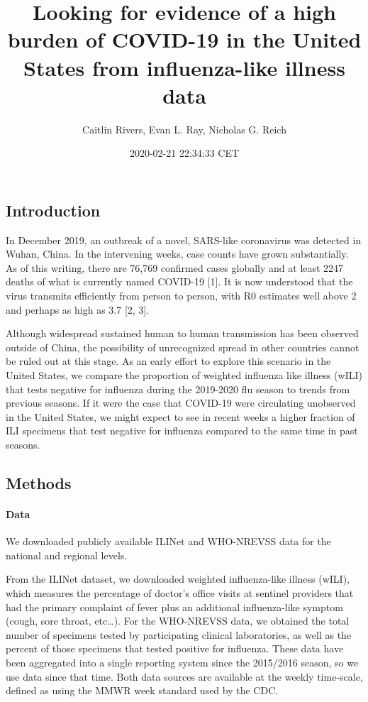 \documentclass[]{article}
\title{Looking for evidence of a high burden of COVID-19 in the United States
from influenza-like illness data}
\author{Caitlin Rivers, Evan L. Ray, Nicholas G. Reich}
\date{2020-02-21 22:34:33 CET}
\let\oldparagraph\paragraph
\renewcommand{\paragraph}[1]{\oldparagraph{#1}\mbox{}}
\begin{document}
\maketitle

\hypertarget{introduction}{%
\subsection{Introduction}\label{introduction}}

In December 2019, an outbreak of a novel, SARS-like coronavirus was
detected in Wuhan, China. In the intervening weeks, case counts have
grown substantially. As of this writing, there are 76,769 confirmed
cases globally and at least 2247 deaths of what is currently named
COVID-19 {[}1{]}. It is now understood that the virus transmits
efficiently from person to person, with R0 estimates well above 2 and
perhaps as high as 3.7 {[}2, 3{]}.

Although widespread sustained human to human transmission has been
observed outside of China, the possibility of unrecognized spread in
other countries cannot be ruled out at this stage. As an early effort to
explore this scenario in the United States, we compare the proportion of
weighted influenza like illness (wILI) that tests negative for influenza
during the 2019-2020 flu season to trends from previous seasons. If it
were the case that COVID-19 were circulating unobserved in the United
States, we might expect to see in recent weeks a higher fraction of ILI
specimens that test negative for influenza compared to the same time in
past seasons.

\hypertarget{methods}{%
\subsection{Methods}\label{methods}}

\hypertarget{data}{%
\paragraph{Data}\label{data}}

We downloaded publicly available ILINet and WHO-NREVSS data for the
national and regional levels.

From the ILINet dataset, we downloaded weighted influenza-like illness
(wILI), which measures the percentage of doctor's office visits at
sentinel providers that had the primary complaint of fever plus an
additional influenza-like symptom (cough, sore throat, etc\ldots{}). For
the WHO-NREVSS data, we obtained the total number of specimens tested by
participating clinical laboratories, as well as the percent of those
specimens that tested positive for influenza. These data have been
aggregated into a single reporting system since the 2015/2016 season, so
we use data since that time. Both data sources are available at the
weekly time-scale, defined as using the MMWR week standard used by the
CDC.
\end{document}
